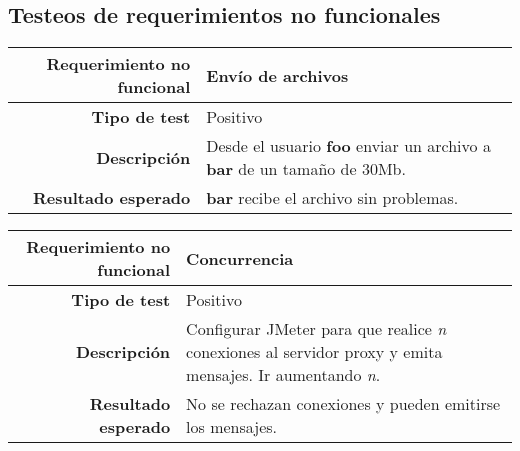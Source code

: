 \documentclass[a4paper,10pt]{article}
\begin{document}
\subsection{Testeos de requerimientos no funcionales}

\begin{center}
  \begin{tabular}{|r|p{12.5cm}|}
    \hline
    \textbf{Requerimiento no funcional}	& Envío de archivos\\
    \hline
    \textbf{Tipo de test}	&	Positivo\\
    \hline
    \textbf{Descripción}	&	Desde el usuario \textbf{foo} enviar un archivo a \textbf{bar} de un tamaño de 30Mb.\\
    \hline
    \textbf{Resultado esperado}	&	\textbf{bar} recibe el archivo sin problemas.\\
    \hline   
  \end{tabular}
\end{center}

\begin{center}
  \begin{tabular}{|r|p{12.5cm}|}
    \hline
    \textbf{Requerimiento no funcional}	& Concurrencia\\
    \hline
    \textbf{Tipo de test}	&	Positivo\\
    \hline
    \textbf{Descripción}	&	Configurar JMeter para que realice \textit{n} conexiones al servidor proxy y emita mensajes.
					Ir aumentando \textit{n}.\\
    \hline
    \textbf{Resultado esperado}	&	No se rechazan conexiones y pueden emitirse los mensajes.\\
    \hline   
  \end{tabular}
\end{center}
\end{document}
